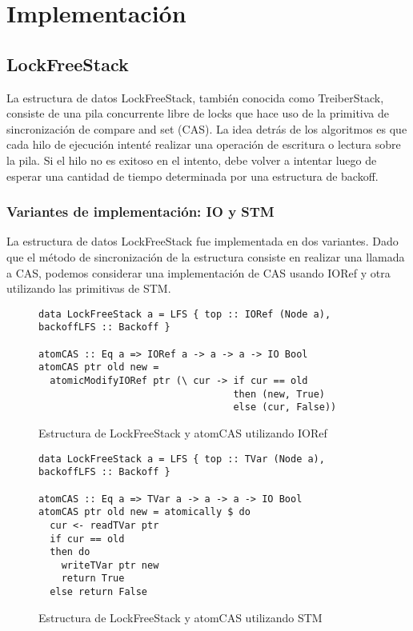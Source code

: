 \chapter{Implementación}

\section{LockFreeStack}
La estructura de datos LockFreeStack, también conocida como TreiberStack, consiste de una pila concurrente libre de locks que hace uso de la primitiva de sincronización de compare and set (CAS). La idea detrás de los algoritmos es que cada hilo de ejecución intenté realizar una operación de escritura o lectura sobre la pila. Si el hilo no es exitoso en el intento, debe volver a intentar luego de esperar una cantidad de tiempo determinada por una estructura de backoff.


\subsection{Variantes de implementación: IO y STM}
La estructura de datos LockFreeStack fue implementada en dos variantes. Dado que el método de sincronización de la estructura consiste en realizar una llamada a CAS, podemos considerar una implementación de CAS usando IORef y otra utilizando las primitivas de STM.

\begin{figure}[h]
\begin{verbatim}
data LockFreeStack a = LFS { top :: IORef (Node a), backoffLFS :: Backoff }

atomCAS :: Eq a => IORef a -> a -> a -> IO Bool
atomCAS ptr old new =
  atomicModifyIORef ptr (\ cur -> if cur == old
                                  then (new, True)
                                  else (cur, False))
\end{verbatim}
\caption{Estructura de LockFreeStack y atomCAS utilizando IORef}
\end{figure}

\begin{figure}[h]
\begin{verbatim}
data LockFreeStack a = LFS { top :: TVar (Node a), backoffLFS :: Backoff }

atomCAS :: Eq a => TVar a -> a -> a -> IO Bool
atomCAS ptr old new = atomically $ do
  cur <- readTVar ptr
  if cur == old
  then do
    writeTVar ptr new
    return True
  else return False
\end{verbatim}
\caption{Estructura de LockFreeStack y atomCAS utilizando STM}
\end{figure}

